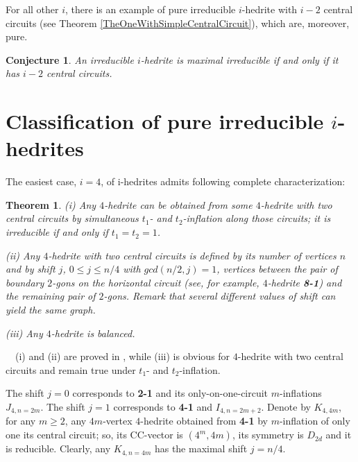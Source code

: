 \documentclass[12pt]{article}
\newtheorem{theorem}{Theorem}
\newtheorem{conjecture}{Conjecture}
\newcommand{\proof}{\noindent{\bf Proof.}\ \ }
\begin{document}
\begin{center}
\epsfxsize=60mm
\end{center}

For all other $i$, there is an example of pure irreducible $i$-hedrite with $i-2$ central circuits (see 
Theorem \ref{TheOneWithSimpleCentralCircuit}), which are, moreover, pure.















\begin{conjecture}
An irreducible $i$-hedrite is maximal irreducible if and only if it has $i-2$ central circuits.
\end{conjecture}



\section{Classification of pure irreducible $i$-hedrites}
The easiest case, $i=4$, of i-hedrites admits following complete
characterization:

\begin{theorem}\label{Theorem-for-4-hedrite}
(i) Any $4$-hedrite can be obtained from some $4$-hedrite with two central
circuits by simultaneous $t_1$- and $t_2$-inflation along those circuits; it is
irreducible if and only if $t_1=t_2=1$.

(ii) Any $4$-hedrite with two central circuits is defined by
its number of vertices $n$ and by {\em shift} $j$, $0 \le j \le n/4$
with $gcd(n/2, j)=1$,
vertices between the pair of boundary $2$-gons on the horizontal
circuit (see, for example, $4$-hedrite {\bf 8-1}) and the remaining
pair of $2$-gons. Remark that several different values of shift can yield
the same graph.

(iii) Any $4$-hedrite is balanced.

\end{theorem}
\proof (i) and (ii) are proved in \cite{DSt}, 
while (iii) is obvious for $4$-hedrite with two central circuits
and remain true under $t_1$- and $t_2$-inflation.

The shift $j=0$ corresponds to {\bf 2-1} and its only-on-one-circuit
$m$-inflations $J_{4,n=2m}$. The shift $j=1$ corresponds to {\bf 4-1} and 
$I_{4,n=2m+2}$.
Denote by $K_{4,4m}$, for any $m \ge 2$, any $4m$-vertex $4$-hedrite obtained
from {\bf 4-1} by $m$-inflation of only one its central circuit; so, its 
CC-vector is $(4^m,4m)$, its symmetry is $D_{2d}$ and it is reducible.
Clearly, any $K_{4,n=4m}$ has the maximal shift $j=n/4$.
\end{document}
